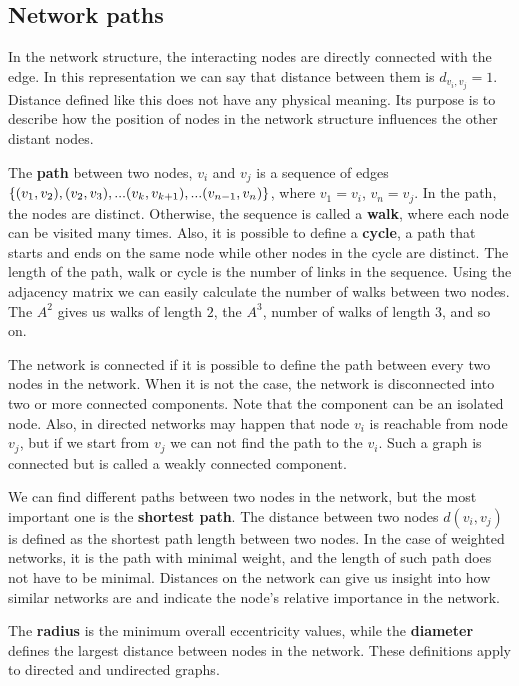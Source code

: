 \subsection{Network paths}
In the network structure, the interacting nodes are directly connected with the edge. In this representation we can say that distance between them is $d_{v_i, v_j}=1$. Distance defined like this does not have any physical meaning. Its purpose is to describe how the position of nodes in the network structure influences the other distant nodes. 

The \textbf{path} between two nodes, $v_i$ and $v_j$ is a sequence of edges $\{(v_1, v_2),  (v_2, v_3), ...(v_k, v_{k+1})\\,... (v_{n-1}, v_n)\}$, where $v_1=v_i$, $v_n=v_j$. In the path, the nodes are distinct. Otherwise, the sequence is called a \textbf{walk}, where each node can be visited many times. Also, it is possible to define a \textbf{cycle}, a path that starts and ends on the same node while other nodes in the cycle are distinct. The length of the path, walk or cycle is the number of links in the sequence. Using the adjacency matrix we can easily calculate the number of walks between two nodes. The $A^2$ gives us walks of length $2$, the $A^3$, number of walks of length 3, and so on. 

The network is connected if it is possible to define the path between every two nodes in the network. When it is not the case, the network is disconnected into two or more connected components. Note that the component can be an isolated node. Also, in directed networks may happen that node $v_i$ is reachable from node $v_j$, but if we start from $v_j$ we can not find the path to the $v_i$. Such a graph is connected but is called a weakly connected component. 

We can find different paths between two nodes in the network, but the most important one is the \textbf{shortest path}. The distance between two nodes $d(v_i, v_j)$ is defined as the shortest path length between two nodes. 
In the case of weighted networks, it is the path with minimal weight, and the length of such path does not have to be minimal. Distances on the network can give us insight into how similar networks are and indicate the node's relative importance in the network. 

The \textbf{radius} is the minimum overall eccentricity values, while the \textbf{diameter} defines the largest distance between nodes in the network. These definitions apply to directed and undirected graphs. 

